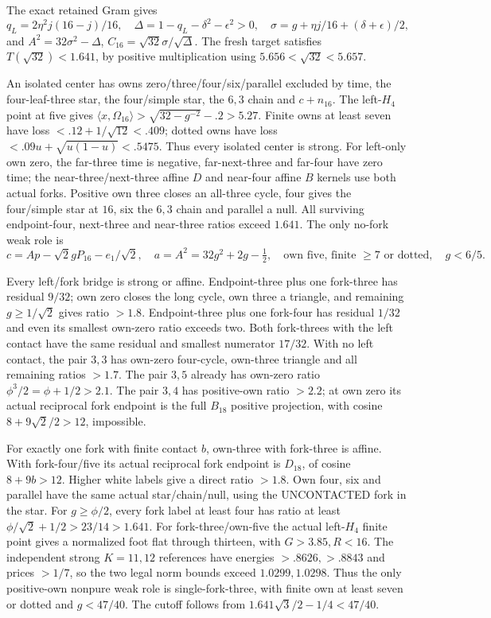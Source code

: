 \documentclass[11pt]{article}
\theoremstyle{definition}
\theoremstyle{remark}
\newcommand{\ip}[2]{\langle #1,#2\rangle}
\begin{document}
The exact retained Gram gives
\[
 q_L=2\eta^2j(16-j)/16,\quad
 \Delta=1-q_L-\delta^2-\epsilon^2>0,\quad
 \sigma=g+\eta j/16+(\delta+\epsilon)/2,
\]
and \(A^2=32\sigma^2-\Delta\),
\(C_{16}=\sqrt{32}\sigma/\sqrt\Delta\).
The fresh target satisfies \(T(\sqrt{32})<1.641\), by positive
multiplication using \(5.656<\sqrt{32}<5.657\).

An isolated center has owns zero/three/four/six/parallel excluded
by time, the four-leaf-three star, the four/simple star, the \(6,3\)
chain and \(c+n_{16}\).
The left-\(H_4\) point at five gives
\(\ip x{\Omega_{16}}>\sqrt{32-g^{-2}}-.2>5.27\).
Finite owns at least seven have loss \(<.12+1/\sqrt{12}<.409\);
dotted owns have loss
\(<.09u+\sqrt{u(1-u)}<.5475\).
Thus every isolated center is strong.
For left-only own zero, the far-three time is negative, far-next-three
and far-four have zero time; the near-three/next-three affine \(D\)
and near-four affine \(B\) kernels use both actual forks.
Positive own three closes an all-three cycle, four gives the
four/simple star at \(16\), six the \(6,3\) chain and parallel a null.
All surviving endpoint-four, next-three and near-three ratios exceed
\(1.641\). The only no-fork weak role is
\[
 c=Ap-\sqrt2gP_{16}-e_1/\sqrt2,\quad
 a=A^2=32g^2+2g-\tfrac12,\quad
 \text{own five, finite }\geq7\text{ or dotted},\quad g<6/5 .
\]

Every left/fork bridge is strong or affine.
Endpoint-three plus one fork-three has residual \(9/32\);
own zero closes the long cycle, own three a triangle, and remaining
\(g\geq1/\sqrt2\) gives ratio \(>1.8\).
Endpoint-three plus one fork-four has residual \(1/32\)
and even its smallest own-zero ratio exceeds two.
Both fork-threes with the left contact have the same residual
and smallest numerator \(17/32\).
With no left contact, the pair \(3,3\) has own-zero four-cycle,
own-three triangle and all remaining ratios \(>1.7\).
The pair \(3,5\) already has own-zero ratio
\(\phi^3/2=\phi+1/2>2.1\).
The pair \(3,4\) has positive-own ratio \(>2.2\);
at own zero its actual reciprocal fork endpoint is the full \(B_{18}\)
positive projection, with cosine \(8+9\sqrt2/2>12\), impossible.

For exactly one fork with finite contact \(b\), own-three with
fork-three is affine. With fork-four/five its actual reciprocal
fork endpoint is \(D_{18}\), of cosine \(8+9b>12\).
Higher white labels give a direct ratio \(>1.8\).
Own four, six and parallel have the same actual star/chain/null,
using the UNCONTACTED fork in the star.
For \(g\geq\phi/2\), every fork label at least four has ratio at least
\(\phi/\sqrt2+1/2>23/14>1.641\).
For fork-three/own-five the actual left-\(H_4\) finite point gives
a normalized foot flat through thirteen, with \(G>3.85,R<16\).
The independent strong \(K=11,12\) references have energies
\(>.8626,>.8843\) and prices \(>1/7\), so the two legal norm
bounds exceed \(1.0299,1.0298\).
Thus the only positive-own nonpure weak role is single-fork-three,
with finite own at least seven or dotted and \(g<47/40\).
The cutoff follows from \(1.641\sqrt3/2-1/4<47/40\).
\end{document}
